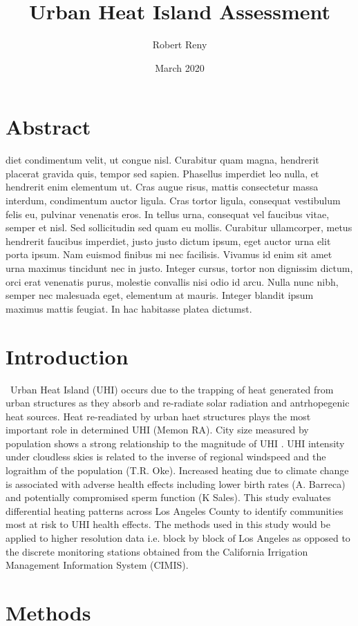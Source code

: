 \documentclass[letterpaper]{article}
\title{Urban Heat Island Assessment}
\author{Robert Reny}
\date{March 2020}
\begin{document}
\maketitle 
\section*{Abstract} %
diet condimentum velit, ut congue nisl. Curabitur quam magna, hendrerit placerat gravida quis, tempor sed sapien. Phasellus imperdiet leo nulla, et hendrerit enim elementum ut. Cras augue risus, mattis consectetur massa interdum, condimentum auctor ligula. Cras tortor ligula, consequat vestibulum felis eu, pulvinar venenatis eros. In tellus urna, consequat vel faucibus vitae, semper et nisl. Sed sollicitudin sed quam eu mollis. Curabitur ullamcorper, metus hendrerit faucibus imperdiet, justo justo dictum ipsum, eget auctor urna elit porta ipsum. Nam euismod finibus mi nec facilisis. Vivamus id enim sit amet urna maximus tincidunt nec in justo. Integer cursus, tortor non dignissim dictum, orci erat venenatis purus, molestie convallis nisi odio id arcu. Nulla nunc nibh, semper nec malesuada eget, elementum at mauris. Integer blandit ipsum maximus mattis feugiat. In hac habitasse platea dictumst.
\newpage
\tableofcontents
\listoffigures
\newpage
\section{Introduction}\
Urban Heat Island (UHI) occurs due to the trapping of heat generated from urban structures as they absorb and re-radiate solar radiation and antrhopegenic heat sources. Heat re-readiated by urban haet structures plays the most important role in determined UHI (Memon RA). City size measured by population shows a strong relationship to the magnitude of UHI . UHI intensity under cloudless skies is related to the inverse of regional windspeed and the lograithm of the population (T.R. Oke). Increased heating due to climate change is associated with adverse health effects including lower birth rates (A. Barreca) and potentially compromised sperm function (K Sales). This study evaluates differential heating patterns across Los Angeles County to identify communities most at risk to UHI health effects. The methods used in this study would be applied to higher resolution data i.e. block by block of Los Angeles as opposed to the discrete monitoring stations obtained from the California Irrigation Management Information System (CIMIS). 
\section{Methods} %
\end{document}
